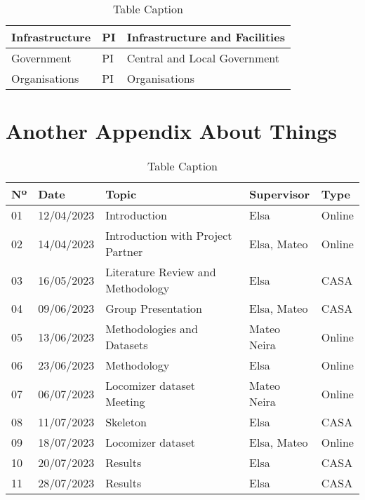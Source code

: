 \begin{table}[H]
\begin{tabular}{lll}
Infrastructure                                                     & PI                                    & Infrastructure and Facilities                                                                                                                                                                                                                                                              \\ \hline
Government                                                         & PI                                    & Central and Local Government                                                                                                                                                                                                                                                               \\ \hline
Organisations                                                      & PI                                    & Organisations                                                                                                                                                                                                                                                                              \\ \hline
\end{tabular}
\caption{Table Caption}
\end{table}

\chapter{Another Appendix About Things}
\label{appendixlabel2}

\begin{table}[h]
\centering
\begin{tabular}{lllll}
\hline
\textbf{Nº} & \textbf{Date} & \textbf{Topic} & \textbf{Supervisor} & \textbf{Type} \\
\hline
01 & 12/04/2023 & Introduction & Elsa & Online \\
02 & 14/04/2023 & Introduction with Project Partner & Elsa, Mateo & Online \\
03 & 16/05/2023 & Literature Review and Methodology & Elsa & CASA \\
04 & 09/06/2023 & Group Presentation & Elsa, Mateo & CASA \\
05 & 13/06/2023 & Methodologies and Datasets & Mateo Neira & Online \\
06 & 23/06/2023 & Methodology & Elsa & Online \\
07 & 06/07/2023 & Locomizer dataset Meeting & Mateo Neira & Online \\
08 & 11/07/2023 & Skeleton & Elsa & CASA \\
09 & 18/07/2023 & Locomizer dataset & Elsa, Mateo & Online \\
10 & 20/07/2023 & Results & Elsa & CASA \\
11 & 28/07/2023 & Results & Elsa & CASA \\
\hline
\end{tabular}
\caption{Table Caption}
\end{table}

